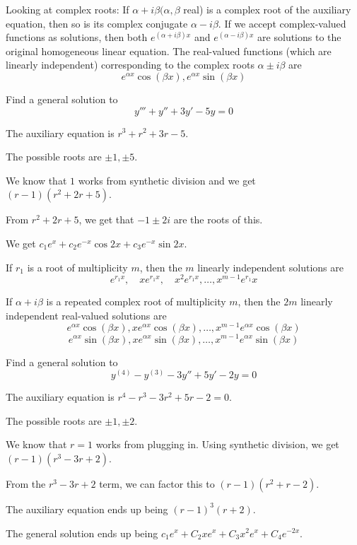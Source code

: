 \documentclass[../diffeq.tex]{subfiles}
\begin{document}
Looking at complex roots: If $\alpha + i\beta (\alpha,\beta$ real) is a complex root of the auxiliary equation, then so is its complex conjugate $\alpha - i\beta$.
If we accept complex-valued functions as solutions, then both $e^{(\alpha+i\beta)x}$ and $e^{(\alpha-i\beta)x}$ are solutions to the original homogeneous linear equation.
The real-valued functions (which are linearly independent) corresponding to the complex roots $\alpha \pm i\beta$ are 
\[ e^{\alpha x}\cos(\beta x), e^{\alpha x}\sin(\beta x) \]

\begin{example}
    Find a general solution to 
    \[ y'''+y''+3y'-5y=0 \]

    The auxiliary equation is $r^3+r^2+3r-5$.

    The possible roots are $\pm 1,\pm 5$.

    We know that $1$ works from synthetic division and we get $(r-1)(r^2+2r+5)$.

    From $r^2+2r+5$, we get that $-1\pm 2i$ are the roots of this.

    We get $c_1e^x+c_2e^{-x}\cos 2x+c_3e^{-x}\sin 2x$.
\end{example}

If $r_1$ is a root of multiplicity $m$, then the $m$ linearly independent solutions are 
\[ e^{r_1x}, \quad xe^{r_1x}, \quad x^2e^{r_1x},\dots ,x^{m-1}e^{r_1}x \]

If $\alpha + i\beta$ is a repeated complex root of multiplicity $m$, then the $2m$ linearly independent real-valued solutions are 
\[ e^{\alpha x}\cos(\beta x), xe^{\alpha x}\cos(\beta x),\dots, x^{m-1}e^{\alpha x}\cos(\beta x) \]
\[ e^{\alpha x}\sin(\beta x), xe^{\alpha x}\sin(\beta x),\dots, x^{m-1}e^{\alpha x}\sin(\beta x) \]

\pagebreak
\begin{example}
    Find a general solution to 
    \[ y^{(4)}-y^{(3)}-3y''+5y'-2y =0 \]

    The auxiliary equation is $r^4-r^3-3r^2+5r-2=0$.

    The possible roots are $\pm 1,\pm 2$.

    We know that $r=1$ works from plugging in. Using synthetic division, we get $(r-1)(r^3-3r+2)$. 

    From the $r^3-3r+2$ term, we can factor this to $(r-1)(r^2+r-2)$.

    The auxiliary equation ends up being $(r-1)^3(r+2)$.

    The general solution ends up being $c_1e^x+C_2xe^x+C_3x^2e^x+C_4e^{-2x}$.
\end{example}
\end{document}
